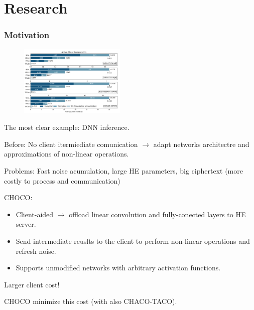 \documentclass[10pt,handout]{beamer}
\begin{document}

\section{Research}

\begin{frame}
\frametitle{Motivation}


\begin{figure}
    \includegraphics[width=0.45\textwidth]{motivation.png}
\end{figure}


The most clear example: DNN inference.

Before: No client itermiediate comunication $\rightarrow$ adapt networks architectre and approximations of non-linear operations.

    Problems: Fast noise acumulation, large HE parameters, big ciphertext (more costly to process and communication)

CHOCO:
\begin{itemize}
    \item Client-aided $\rightarrow$ offload linear convolution and fully-conected layers to HE server.
    \item Send intermediate reuslts to the client to perform non-linear operations and refresh noise.
    \item Supports unmodified networks with arbitrary activation functions.
\end{itemize}

Larger client cost!

    CHOCO minimize this cost (with also CHACO-TACO).

\end{frame}


\end{document}
